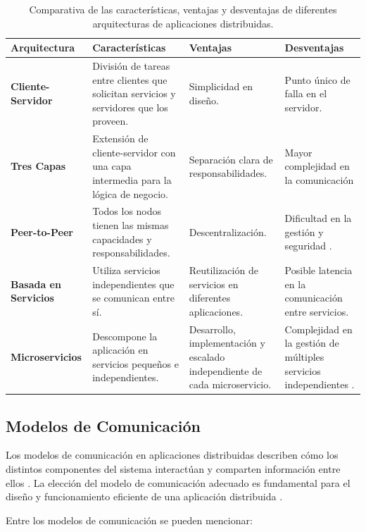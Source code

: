 \begin{table}[h!]
	\centering
	\caption{Comparativa de las características, ventajas y desventajas de diferentes arquitecturas de aplicaciones distribuidas.}
	\begin{tabular}{|p{2.8cm}|p{3.8cm}|p{3.8cm}|p{3.8cm}|}
		\hline
		\textbf{Arquitectura} & \textbf{Características} & \textbf{Ventajas} & \textbf{Desventajas} \\
		\hline
		\textbf{Cliente-Servidor} & División de tareas entre clientes que solicitan servicios y servidores que los proveen. & Simplicidad en diseño. & Punto único de falla en el servidor. \\
		\hline
		\textbf{Tres Capas} & Extensión de cliente-servidor con una capa intermedia para la lógica de negocio. & Separación clara de responsabilidades. & Mayor complejidad en la comunicación  \\
		\hline
		\textbf{Peer-to-Peer} & Todos los nodos tienen las mismas capacidades y responsabilidades. & Descentralización. & Dificultad en la gestión y seguridad . \\
		\hline
		\textbf{Basada en Servicios} & Utiliza servicios independientes que se comunican entre sí. & Reutilización de servicios en diferentes aplicaciones. & Posible latencia en la comunicación entre servicios\cite{Hogie2023}. \\
		\hline
		\textbf{Microservicios} & Descompone la aplicación en servicios pequeños e independientes. & Desarrollo, implementación y escalado independiente de cada microservicio. & Complejidad en la gestión de múltiples servicios independientes \cite{Rusek2021}. \\
		\hline
		\end{tabular}
		\label{tabla:arquitecturas}
	\end{table}

	\subsection{Modelos de Comunicación}
	\noindent
	Los modelos de comunicación en aplicaciones distribuidas describen cómo los distintos componentes del sistema interactúan y comparten información entre ellos \cite{Balador2017}. La elección del modelo de comunicación adecuado es fundamental para el diseño y funcionamiento eficiente de una aplicación distribuida \cite{Moll2021survey}.
	
	Entre los modelos de comunicación se pueden mencionar:
	
